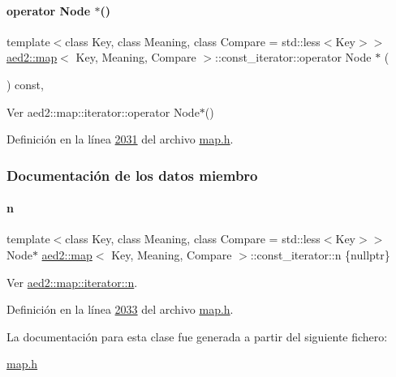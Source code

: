 \paragraph{\texorpdfstring{operator Node $\ast$()}{operator Node *()}}
{\footnotesize\ttfamily template$<$class Key, class Meaning, class Compare = std\+::less$<$\+Key$>$$>$ \\
\hyperlink{classaed2_1_1map}{aed2\+::map}$<$ Key, Meaning, Compare $>$\+::const\+\_\+iterator\+::operator Node $\ast$ (\begin{DoxyParamCaption}{ }\end{DoxyParamCaption}) const\hspace{0.3cm}{\ttfamily [inline]}, {\ttfamily [private]}}



Ver aed2\+::map\+::iterator\+::operator Node$\ast$() 



Definición en la línea \hyperlink{map_8h_source_l02031}{2031} del archivo \hyperlink{map_8h_source}{map.\+h}.



\subsubsection{Documentación de los datos miembro}
\mbox{\label{classaed2_1_1map_1_1const__iterator_a921e123f9c7f94610cf9fee3ab55d277_a921e123f9c7f94610cf9fee3ab55d277}} 
\paragraph{\texorpdfstring{n}{n}}
{\footnotesize\ttfamily template$<$class Key, class Meaning, class Compare = std\+::less$<$\+Key$>$$>$ \\
Node$\ast$ \hyperlink{classaed2_1_1map}{aed2\+::map}$<$ Key, Meaning, Compare $>$\+::const\+\_\+iterator\+::n \{nullptr\}\hspace{0.3cm}{\ttfamily [private]}}



Ver \hyperlink{classaed2_1_1map_1_1iterator_adf8633ef71bb6c1fc01c0abe8728fd93_adf8633ef71bb6c1fc01c0abe8728fd93}{aed2\+::map\+::iterator\+::n}. 



Definición en la línea \hyperlink{map_8h_source_l02033}{2033} del archivo \hyperlink{map_8h_source}{map.\+h}.



La documentación para esta clase fue generada a partir del siguiente fichero\+:\begin{DoxyCompactItemize}
\item 
\hyperlink{map_8h}{map.\+h}\end{DoxyCompactItemize}
